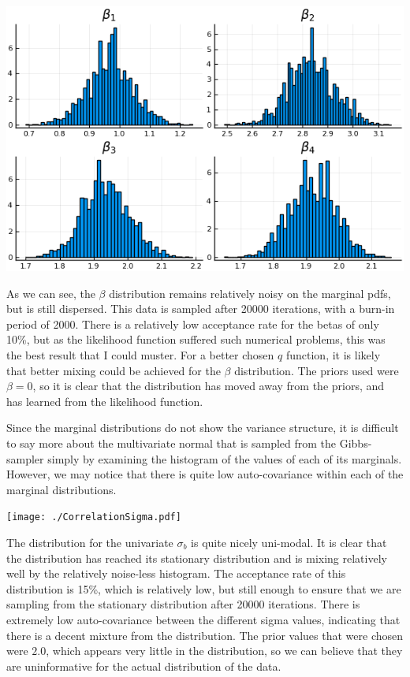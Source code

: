 \documentclass[12pt]{paper}
\begin{document}
\begin{center}
\includegraphics[width=.9\linewidth]{./betaHist.png}
\end{center}

As we can see, the \(\beta\) distribution remains relatively noisy on the
marginal pdfs, but is still dispersed. This data is sampled after
20000 iterations, with a burn-in period of 2000. There is a relatively
low acceptance rate for the betas of only 10\%, but as the likelihood
function suffered such numerical problems, this was the best result
that I could muster. For a better chosen \(q\) function, it is likely
that better mixing could be achieved for the \(\beta\) distribution. The
priors used were \(\beta = 0\), so it is clear that the distribution has
moved away from the priors, and has learned from the likelihood
function.

Since the marginal distributions do not show the variance structure,
it is difficult to say more about the multivariate normal that is
sampled from the Gibbs-sampler simply by examining the histogram of the
values of each of its marginals. However, we may notice that there is
quite low auto-covariance within each of the marginal distributions.

\begin{center}
\texttt{[image: ./CorrelationSigma.pdf]}
\end{center}

The distribution for the univariate \(\sigma_b\) is quite
nicely uni-modal. It is clear that the distribution has reached its
stationary distribution and is mixing relatively well by the
relatively noise-less histogram. The acceptance rate of this
distribution is 15\%, which is relatively low, but still enough to
ensure that we are sampling from the stationary distribution after
20000 iterations. There is extremely low auto-covariance between the
different sigma values, indicating that there is a decent mixture from
the distribution. The prior values that were chosen were $2.0$, which
appears very little in the distribution, so we can believe that they
are uninformative for the actual distribution of the data.
\end{document}
